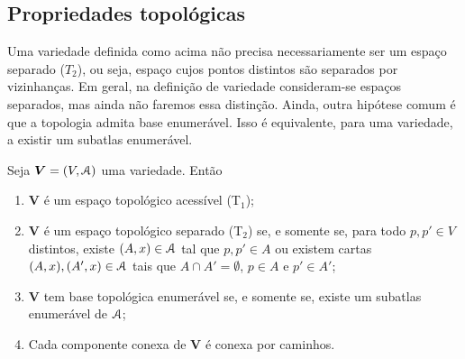 \subsection{Propriedades topológicas}

Uma variedade definida como acima não precisa necessariamente ser um espaço separado ($T_2$), ou seja, espaço cujos pontos distintos são separados por vizinhanças. Em geral, na definição de variedade consideram-se espaços separados, mas ainda não faremos essa distinção. Ainda, outra hipótese comum é que a topologia admita base enumerável. Isso é equivalente, para uma variedade, a existir um subatlas enumerável.

\begin{proposition}
Seja $\bm V = (V,\mathcal{A})$ uma variedade. Então
	\begin{enumerate}
	\item $\bm V$ é um espaço topológico acessível (T$_1$);
	
	\item $\bm V$ é um espaço topológico separado (T$_2$) se, e somente se, para todo $p,p' \in V$ distintos, existe $(A,x) \in \mathcal{A}$ tal que $p,p' \in A$ ou existem cartas $(A,x), (A',x) \in \mathcal{A}$ tais que $A \cap A' = \emptyset$, $p \in A$ e $p' \in A'$;
	
	\item $\bm V$ tem base topológica enumerável se, e somente se, existe um subatlas enumerável de $\mathcal{A}$;
	
	\item Cada componente conexa de $\bm V$ é conexa por caminhos.
	\end{enumerate}
\end{proposition}
